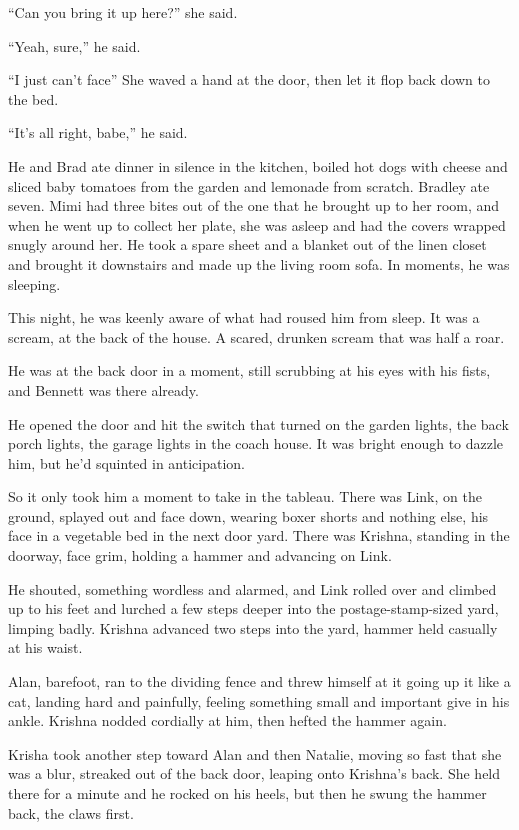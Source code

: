 ``Can you bring it up here?'' she said.

``Yeah, sure,'' he said. 

``I just can't face\dash{}'' She waved a hand at the door, then let it
flop back down to the bed.

``It's all right, babe,'' he said.

He and Brad ate dinner in silence in the kitchen, boiled hot dogs with
cheese and sliced baby tomatoes from the garden and lemonade from
scratch.  Bradley ate seven.  Mimi had three bites out of the one that
he brought up to her room, and when he went up to collect her plate,
she was asleep and had the covers wrapped snugly around her.  He took
a spare sheet and a blanket out of the linen closet and brought it
downstairs and made up the living room sofa.  In moments, he was
sleeping.

This night, he was keenly aware of what had roused him from sleep.  It
was a scream, at the back of the house.  A scared, drunken scream that
was half a roar.

He was at the back door in a moment, still scrubbing at his eyes with
his fists, and Bennett was there already. 

He opened the door and hit the switch that turned on the garden
lights, the back porch lights, the garage lights in the coach house. 
It was bright enough to dazzle him, but he'd squinted in anticipation.

So it only took him a moment to take in the tableau.  There was Link,
on the ground, splayed out and face down, wearing boxer shorts and
nothing else, his face in a vegetable bed in the next door yard. 
There was Krishna, standing in the doorway, face grim, holding a
hammer and advancing on Link.

He shouted, something wordless and alarmed, and Link rolled over and
climbed up to his feet and lurched a few steps deeper into the
postage-stamp-sized yard, limping badly.  Krishna advanced two steps
into the yard, hammer held casually at his waist.

Alan, barefoot, ran to the dividing fence and threw himself at it
going up it like a cat, landing hard and painfully, feeling something
small and important give in his ankle.  Krishna nodded cordially at
him, then hefted the hammer again.

Krisha took another step toward Alan and then Natalie, moving so fast
that she was a blur, streaked out of the back door, leaping onto
Krishna's back.  She held there for a minute and he rocked on his
heels, but then he swung the hammer back, the claws first. 

